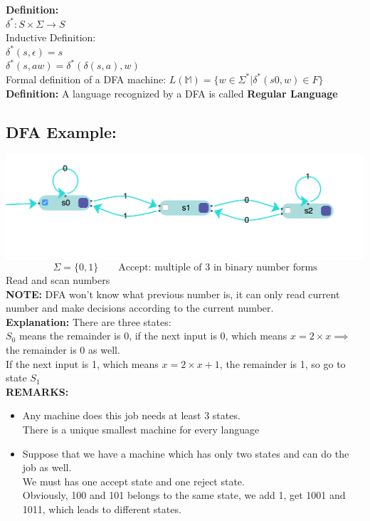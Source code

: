 \documentclass [9 pt]{article}
\theoremstyle{definition}
\begin{document}
\textbf{Definition: }\\
$\delta^{*} : S \times \Sigma \to S$\\
\newline
Inductive Definition:\\
$\delta^*(s, \epsilon ) = s $\\
$\delta^*(s, aw ) = \delta^*( \delta(s, a) , w ) $\\
\newline
\newline
Formal definition of a DFA machine: $L(\mathbb{M}) = \{w\in \Sigma^*|\delta^*(s0, w) \in F\}$\\
\newline
\newline
\textbf{Definition:}
A language recognized by a DFA is called \textbf{Regular Language}

\subsection*{DFA Example:}
\includegraphics[scale=0.7]{1.png}
$$\Sigma = \{ 0, 1\}\quad\quad \text{Accept: multiple of 3 in binary number forms}$$
Read and scan numbers\\
\textbf{NOTE:} DFA won't know what previous number is, it can only read current number and make decisions according to the current number.\\
\textbf{Explanation: } There are three states: \\
$S_0 $ means the remainder is 0, if the next input is 0, which means $x = 2\times x \implies $ the remainder is 0 as well.\\
If the next input is 1, which means $x = 2\times x + 1$, the remainder is 1, so go to state $S_1$\\
\newline
\textbf{REMARKS:}
\begin{itemize}
	\item Any machine does this job needs at least 3 states.\\
		  There is a unique smallest machine for every language\\
	\item Suppose that we have a machine which has only two states and can do the job as well.\\
		  We must has one accept state and one reject state. \\
		  Obviously, 100 and 101 belongs to the same state, we add 1, get 1001 and 1011, which leads to different states.
\end{itemize}
\end{document}
